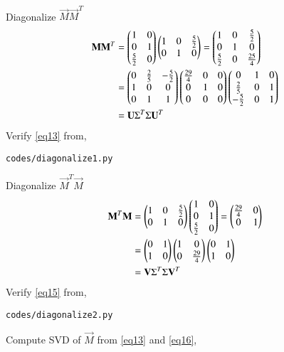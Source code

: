 \documentclass[journal,12pt,twocolumn]{IEEEtran}
\begin{document}
\\
Diagonalize $\vec{M}\vec{M}^T$
\begin{align}
	\label{eq12}\mathbf{M}\mathbf{M}^T &= \begin{pmatrix}1 & 0\\0 & 1\\\frac{5}{2} & 0\end{pmatrix}\begin{pmatrix}1 & 0 & \frac{5}{2}\\0 & 1 & 0\end{pmatrix} = \begin{pmatrix}1 & 0 & \frac{5}{2}\\0 & 1 & 0\\\frac{5}{2} & 0 & \frac{25}{4}\end{pmatrix}\\
	\label{eq13}&= \begin{pmatrix}0 & \frac{2}{5} & -\frac{5}{2}\\1 & 0 & 0\\0 & 1 & 1\end{pmatrix}\begin{pmatrix}\frac{29}{4} & 0 & 0\\0 & 1 & 0\\0 & 0 & 0\end{pmatrix}\begin{pmatrix}0 & 1 & 0\\\frac{2}{5} & 0 & 1\\-\frac{5}{2} & 0 & 1\end{pmatrix}\\
	&= \mathbf{U}\Sigma^T\Sigma\mathbf{U}^T
\end{align}
Verify \eqref{eq13} from,
\begin{lstlisting}
codes/diagonalize1.py
\end{lstlisting}
Diagonalize $\vec{M}^T\vec{M}$
\begin{align}
	\label{e14}\mathbf{M}^T\mathbf{M} &= \begin{pmatrix}1 & 0 & \frac{5}{2}\\0 & 1 & 0\end{pmatrix}\begin{pmatrix}1 & 0\\0 & 1\\\frac{5}{2} & 0\end{pmatrix} = \begin{pmatrix}\frac{29}{4} & 0\\0 & 1\end{pmatrix}\\
	\label{eq15}&= \begin{pmatrix}0 & 1\\1 & 0\end{pmatrix}\begin{pmatrix}1 & 0\\0 & \frac{29}{4}\end{pmatrix}\begin{pmatrix}0 & 1\\1 & 0\end{pmatrix}\\
	&= \mathbf{V}\Sigma^T\Sigma\mathbf{V}^T
\end{align}
Verify \eqref{eq15} from,
\begin{lstlisting}
codes/diagonalize2.py
\end{lstlisting}
Compute SVD of $\vec{M}$ from \eqref{eq13} and \eqref{eq16},
\end{document}
